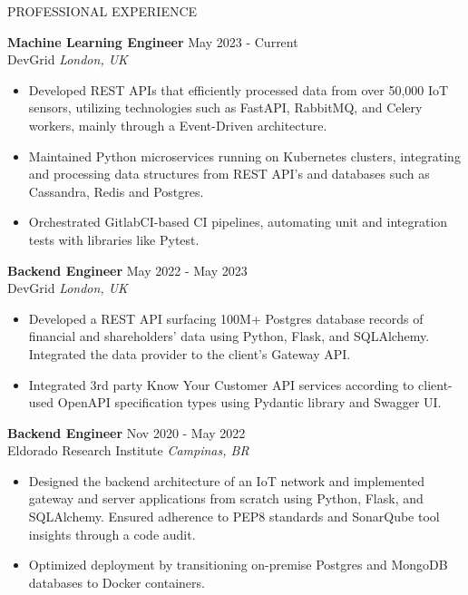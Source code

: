 \documentclass{resume} %
\begin{document}
\begin{rSection}{PROFESSIONAL EXPERIENCE}

\textbf{Machine Learning Engineer} \hfill May 2023 - Current\\
DevGrid \hfill \textit{London, UK}
 \begin{itemize}
    \itemsep -3pt {} 
     \item Developed REST APIs that efficiently processed data from over 50,000 IoT sensors, utilizing technologies such as FastAPI, RabbitMQ, and Celery workers, mainly through a Event-Driven architecture.
     \item Maintained Python microservices running on Kubernetes clusters, integrating and processing data structures from REST API's and databases such as Cassandra, Redis and Postgres.
     \item Orchestrated GitlabCI-based CI pipelines, automating unit and integration tests with libraries like Pytest.

 \end{itemize}
 
\textbf{Backend Engineer} \hfill May 2022 - May 2023\\
DevGrid \hfill \textit{London, UK}
 \begin{itemize}
    \itemsep -3pt {} 
     \item Developed a REST API surfacing 100M+ Postgres database records of financial and shareholders' data using Python, Flask, and SQLAlchemy. Integrated the data provider to the client's Gateway API.
     \item Integrated 3rd party Know Your Customer API services according to client-used OpenAPI specification types using Pydantic library and Swagger UI.
 \end{itemize}

\textbf{Backend Engineer} \hfill Nov 2020 - May 2022\\
Eldorado Research Institute \hfill \textit{Campinas, BR}
 \begin{itemize}
    \itemsep -3pt {} 
     \item Designed the backend architecture of an IoT network and implemented gateway and server applications from scratch using Python, Flask, and SQLAlchemy. Ensured adherence to PEP8 standards and SonarQube tool insights through a code audit.
     \item Optimized deployment by transitioning on-premise Postgres and MongoDB databases to Docker containers.
 \end{itemize}


\end{rSection}
\end{document}
